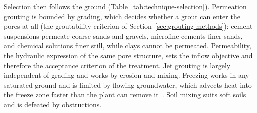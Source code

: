 Selection then follows the ground (Table~\ref{tab:technique-selection}).
Permeation grouting is bounded by grading,
which decides whether a grout can enter the pores at all (the groutability
criterion of Section~\ref{sec:grouting-methods}): cement suspensions permeate
coarse sands and gravels, microfine cements finer sands, and chemical solutions
finer still, while clays cannot be permeated. Permeability, the
hydraulic expression of the same pore structure, sets the inflow objective
and therefore the acceptance criterion of the treatment.
Jet grouting is largely independent of grading and works by erosion and
mixing. Freezing works in any saturated ground and is limited by flowing
groundwater, which advects heat into the freeze zone faster than the plant
can remove it~\citep{andersland2004frozen}.
Soil mixing suits soft soils and is defeated by obstructions.

